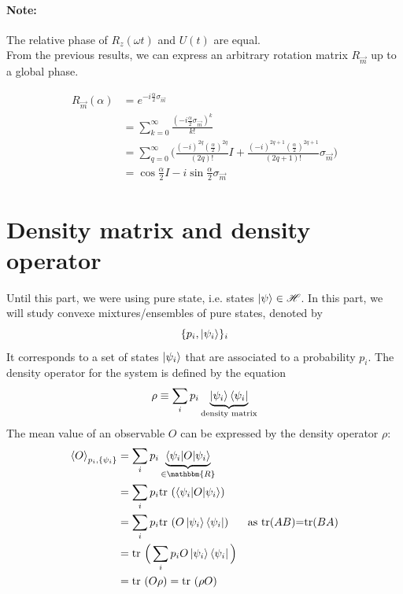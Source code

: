 \documentclass{article}
\begin{document}
\paragraph{Note: }
The relative phase of $R_z(\omega t)$ and $U(t)$ are equal. \\\noindent From the
previous results, we can express an arbitrary rotation matrix $R_{\vec{m}}$ up
to a global phase.

\begin{equation}
    \begin{aligned}
        R_{\vec{m}}(\alpha)
            & = e^{-i\frac{\alpha}{2}\sigma_{\vec{m}}} \\
            & = \sum_{k=0}^\infty
             \frac{(-i \frac{\alpha}{2}\sigma_{\vec{m}})^k}{k!} \\
            & = \sum_{q=0}^\infty \Big(\frac{(-i)^{2q}(\frac{\alpha}{2})^{2q}}{(2q)!}I +
                \frac{(-i)^{2q+1}(\frac{\alpha}{2})^{2q+1}}{(2q+1)!}\sigma_{\vec{m}}\Big) \\
            & = \cos\frac{\alpha}{2}I - i\sin\frac{\alpha}{2}\sigma_{\vec{m}}
    \end{aligned}
\end{equation}

\section{Density matrix and density operator}

Until this part, we were using pure state, i.e. states $\ket{\psi} \in
\mathscr{H}$. In this part, we will study convexe mixtures/ensembles of pure
states, denoted by
\begin{equation}
    \{p_i, \ket{\psi_i}\}_i
\end{equation}
It corresponds to a set of states $\ket{\psi_i}$ that are associated to a
probability $p_i$. The density operator for the system is defined by the
equation
\begin{equation}
    \label{def-density-matrix}
    \rho \equiv \sum_ip_i\underbrace{\ket{\psi_i}\bra{\psi_i}}_{\text{density matrix}}
\end{equation}
The mean value of an observable $O$ can be expressed by the density operator
$\rho$:
\begin{equation}
    \label{expectation-value-and-trace}
    \begin{aligned}
        \braket{O}_{p_i, \{\psi_i\}}
            & = \sum_i p_i \underbrace{\braket{\psi_i|O|\psi_i}}_{\in \mathbbm{R}} \\
            & = \sum_i p_i \text{tr }(\braket{\psi_i|O|\psi_i}) \\
            & = \sum_i p_i \text{tr }(O\ket{\psi_i}\bra{\psi_i}) & \text{as tr($AB$)=tr($BA$)} \\
            & = \text{tr }\Big(\sum_ip_iO\ket{\psi_i}\bra{\psi_i}\Big) \\
            & = \text{tr }(O\rho) = \text{tr }(\rho O)
    \end{aligned}
\end{equation}
\end{document}
